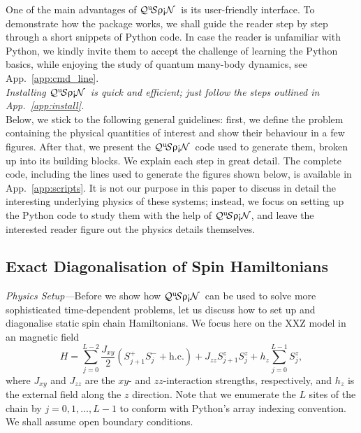 \documentclass{SciPost}
\newcommand\0{\scalebox{-1}[1]{0}}
\newcommand{\qspin}{$\mathcal{Q}^{\mathrm{u}}\!\mathcal{S}\uprho\mathrm{\text{\textexclamdown}}\mathcal{N}$}
\begin{document}
One of the main advantages of \qspin\ is its user-friendly interface. To demonstrate how the package works, we shall guide the reader step by step through a short snippets of Python code. In case the reader is unfamiliar with Python, we kindly invite them to accept the challenge of learning the Python basics, while enjoying the study of quantum many-body dynamics, see App.~\ref{app:cmd_line}. \\

\emph{Installing \qspin\ is quick and efficient; just follow the steps outlined in App.~\ref{app:install}.}\\

\noindent Below, we stick to the following general guidelines: first, we define the problem containing the physical quantities of interest and show their behaviour in a few figures. After that, we present the \qspin\ code used to generate them, broken up into its building blocks. We explain each step in great detail. The complete code, including the lines used to generate the figures shown below, is available in App.~\ref{app:scripts}. It is not our purpose in this paper to discuss in detail the interesting underlying physics of these systems; instead, we focus on setting up the Python code to study them with the help of \qspin, and leave the interested reader figure out the physics details themselves.

\subsection{Exact Diagonalisation of Spin Hamiltonians}
\label{subsec:ED}



\emph{Physics Setup---}Before we show how \qspin\ can be used to solve more sophisticated time-dependent problems, let us discuss how to set up and diagonalise static spin chain Hamiltonians. We focus here on the XXZ model in an magnetic field
\begin{equation}
H = \sum_{j=0}^{L-2}\frac{J_{xy}}{2}\left(S^+_{j+1}S^-_{j} + \mathrm{h.c.}\right) + J_{zz}S^z_{j+1}S^z_{j} + h_z\sum_{j=0}^{L-1}S^z_{j},
\label{eq:XXZ_ED}
\end{equation} 
where $J_{xy}$ and $J_{zz}$ are the $xy$- and $zz$-interaction strengths, respectively, and $h_z$ is the external field along the $z$ direction. Note that we enumerate the $L$ sites of the chain by $j = 0,1,\dots, L-1$ to conform with Python's array indexing convention. We shall assume open boundary conditions.
\end{document}
